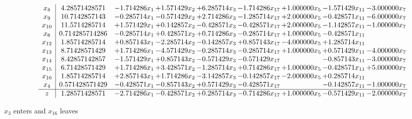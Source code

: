 \documentclass[10pt]{article}
\begin{document}
 \[\begin{array}{c| c c@{\hskip 2pt} c@{\hskip 2pt} c@{\hskip 2pt} c@{\hskip 2pt} c@{\hskip 2pt} c@{\hskip 2pt} c@{\hskip 2pt} }
 x_{8}   &  4.28571428571 & -1.714286 x_{1} & + 1.571429 x_{2} & + 6.285714 x_{3} & -1.714286 x_{17} & + 1.000000 x_{5} & -1.571429 x_{11} & -3.000000 x_{7}\\
 x_{9}   &  10.7142857143 & -0.285714 x_{1} & -0.571429 x_{2} & + 2.714286 x_{3} & -1.285714 x_{17} & + 2.000000 x_{5} & -0.428571 x_{11} & -6.000000 x_{7}\\
 x_{10}   &  11.5714285714 & + 1.571429 x_{1} & + 0.142857 x_{2} & -0.428571 x_{3} & -0.428571 x_{17} & + 2.000000 x_{5} & -1.142857 x_{11} & -1.000000 x_{7}\\
 x_{6}   &  0.714285714286 & -0.285714 x_{1} & + 0.428571 x_{2} & + 0.714286 x_{3} & -0.285714 x_{17} & + 1.000000 x_{5} & -0.428571 x_{11} &   \\
 x_{12}   &  1.85714285714 & + 0.857143 x_{1} & -2.285714 x_{2} & -0.142857 x_{3} & + 0.857143 x_{17} & -4.000000 x_{5} & + 1.285714 x_{11} &   \\
 x_{13}   &  8.71428571429 & + 1.714286 x_{1} & -4.571429 x_{2} & -0.285714 x_{3} & -0.285714 x_{17} & + 1.000000 x_{5} & + 0.571429 x_{11} & -4.000000 x_{7}\\
 x_{14}   &  8.42857142857 & -1.571429 x_{1} & + 0.857143 x_{2} & -0.571429 x_{3} & -0.571429 x_{17} &   & -0.857143 x_{11} & -3.000000 x_{7}\\
 x_{15}   &  6.71428571429 & + 1.714286 x_{1} & + 3.428571 x_{2} & -1.285714 x_{3} & + 0.714286 x_{17} & + 1.000000 x_{5} & -0.428571 x_{11} & + 5.000000 x_{7}\\
 x_{16}   &  1.85714285714 & + 2.857143 x_{1} & + 1.714286 x_{2} & -3.142857 x_{3} & -0.142857 x_{17} & -2.000000 x_{5} & + 0.285714 x_{11} &   \\
 x_{4}   &  0.571428571429 & -0.428571 x_{1} & -0.857143 x_{2} & + 0.571429 x_{3} & -0.428571 x_{17} &   & -0.142857 x_{11} & -1.000000 x_{7}\\
\hline
z    &  1.28571428571 & -2.714286 x_{1} & -0.428571 x_{2} & + 0.285714 x_{3} & -0.714286 x_{17} & + 1.000000 x_{5} & -0.571429 x_{11} & -2.000000 x_{7}\\
\end{array}\]


 $ x_{3} $ enters and $ x_{16} $ leaves 
\end{document}
